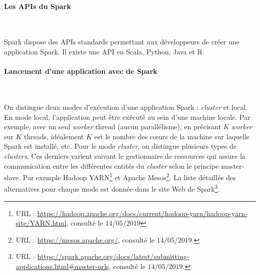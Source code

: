  










\paragraph{Les APIs du Spark}~

Spark dispose des APIs standards permettant aux développeurs  de créer une application Spark. Il existe une API en Scala, Python, Java et R. 

\paragraph{Lancement d'une application avec de Spark} \label{spark-master-modes}~

On distingue deux modes d'exécution d'une application  Spark : \textit{cluster} et local. En  mode local, l'application  peut être exécuté au sein d'une machine locale. Par exemple,  avec un seul \textit{worker} thread (aucun parallélisme),  en précisant $K$ \textit{worker} sur $K$ threads, idéalement $K$ est le nombre des  c\oe{}urs de la machine sur laquelle Spark est installé, etc. 
 Pour le mode \textit{cluster}, on distingue plusieurs types de \textit{clusters}. Ces derniers  varient suivant le gestionnaire de ressources qui assure la communication entre les différentes entités du \textit{cluster} selon le principe master-slave. Par exemple Hadoop YARN\footnote{URL : \url{https://hadoop.apache.org/docs/current/hadoop-yarn/hadoop-yarn-site/YARN.html}, consulté  le $14/05/2019$ } et Apache Mesos\footnote{URL : \url{https://mesos.apache.org/}, consulté le $14/05/2019$.}. La liste détaillée des alternatives pour chaque mode est donnée dans le site Web de Spark\footnote{URL : \url{https://spark.apache.org/docs/latest/submitting-applications.html\#master-urls}, consulté le $14/05/2019$.}. 
 
